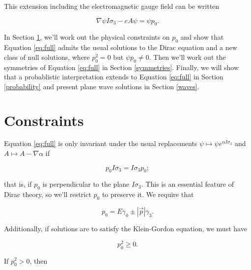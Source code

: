 \documentclass{article}
\begin{document}
  This extension including the electromagnetic gauge field can be written

  \begin{equation}
    \nabla \psi I \sigma_3 - e A \psi = \psi p_0. \label{eq:full}
  \end{equation}

  In Section \ref{constraints}, we'll work out the physical constraints on $p_0$ and show that Equation \ref{eq:full} admits the usual solutions to the Dirac equation and a new class of null solutions, where $p_0^2 = 0$ but $\psi p_0 \not = 0$. Then we'll work out the symmetries of Equation \ref{eq:full} in Section \ref{symmetries}. Finally, we will show that a probablistic interpretation extends to Equation \ref{eq:full} in Section \ref{probability} and present plane wave solutions in Section \ref{waves}. 


  \section{Constraints}\label{constraints}

  Equation \ref{eq:full} is only invariant under the usual replacements $\psi \mapsto \psi e^{\alpha I \sigma_3}$ and $A \mapsto A - \nabla \alpha$ if 

  \begin{equation}
    p_0 I\sigma_3 = I \sigma_3 p_0; \label{momentum-perp-spin}
  \end{equation} 

  that is, if $p_0$ is perpendicular to the plane $I \sigma_3$. This is an essential feature of Dirac theory, so we'll restrict $p_0$ to preserve it. We require that

  \begin{equation}
    p_0 = E \gamma_0 \pm |\vec p| \gamma_3.\label{eq:p_0}
  \end{equation} 

  Additionally, if solutions are to satisfy the Klein-Gordon equation, we must have 

  \begin{equation}
    p_0^2 \geq 0.
  \end{equation}

  If $p_0^2 > 0$, then 
\end{document}
